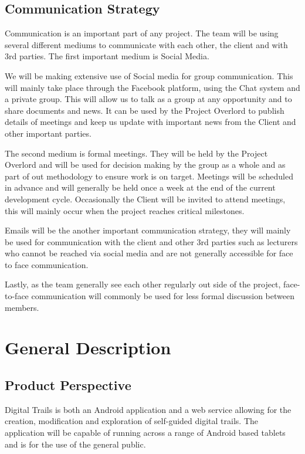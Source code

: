 \documentclass[11pt,a4paper]{article}
\begin{document}
\subsection{Communication Strategy}

Communication is an important part of any project. The team will be using several different mediums to communicate with each other, the client and with 3rd parties. The first important medium is Social Media. 

We will be making extensive use of Social media for group communication. This will mainly take place through the Facebook platform, using the Chat system and a private group. This will allow us to talk as a group at any opportunity and to share documents and news. It can be used by the Project Overlord to publish details of meetings and keep us update with important news from the Client and other important parties. 

The second medium is formal meetings. They will be held by the Project Overlord and will be used for decision making by the group as a whole and as part of out methodology to ensure work is on target. Meetings will be scheduled in advance and will generally be held once a week at the end of the current development cycle. Occasionally the Client will be invited to attend meetings, this will mainly occur when the project reaches critical milestones. 

Emails will be the another important communication strategy, they will mainly be used for communication with the client and other 3rd parties such as lecturers who cannot be reached via social media and are not generally accessible for face to face communication. 

Lastly, as the team generally see each other regularly out side of the project, face-to-face communication will commonly be used for less formal discussion between members. 

\section{General Description}
\label{sec:gen-desc}

\subsection{Product Perspective}
\label{sec:product-perspective}
Digital Trails is both an Android application and a web service allowing for the creation, modification and exploration of self-guided digital trails. The application will be capable of running across a range of Android based tablets and is for the use of the general public.
\end{document}
